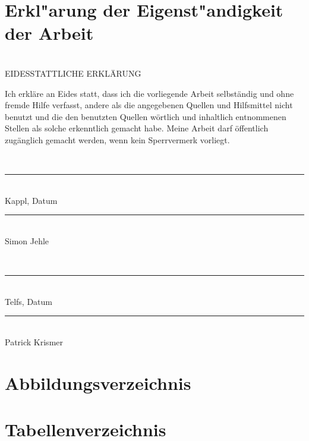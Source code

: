 \documentclass[12pt,a4paper]{article}
\begin{document}
\section{Erkl"arung der Eigenst"andigkeit der Arbeit}
	\noindent\\[0mm] EIDESSTATTLICHE ERKLÄRUNG
	\\[4mm]
	\parbox{152mm}{
	Ich erkläre an Eides statt, dass ich die vorliegende Arbeit selbständig und ohne
	fremde Hilfe verfasst, andere als die angegebenen Quellen und Hilfsmittel nicht
	benutzt und die den benutzten Quellen wörtlich und inhaltlich entnommenen
	Stellen als solche erkenntlich gemacht habe. Meine Arbeit darf öffentlich
	zugänglich gemacht werden, wenn kein Sperrvermerk vorliegt.
	}
	\\[19mm]\parbox{80mm}{
		\rule{60mm}{.5pt}\\
		\hspace*{3mm}Kappl, Datum
	}
	\parbox{80mm}{
		\rule{70mm}{.5pt}\\
		\hspace*{3mm}Simon Jehle
	}
		\\[19mm]\parbox{80mm}{
		\rule{60mm}{.5pt}\\
		\hspace*{3mm}Telfs, Datum
	}
	\parbox{80mm}{
		\rule{70mm}{.5pt}\\
		\hspace*{3mm}Patrick Krismer
	}

%
%
\newpage
\renewcommand{\thesection}{\Roman{section}\;}
\setcounter{section}{0}
%
\section{Abbildungsverzeichnis}
\vspace{-10mm}
\listoffigures
%	
%	
\section{Tabellenverzeichnis}
\listoftables
%
%
\newpage
\end{document}
